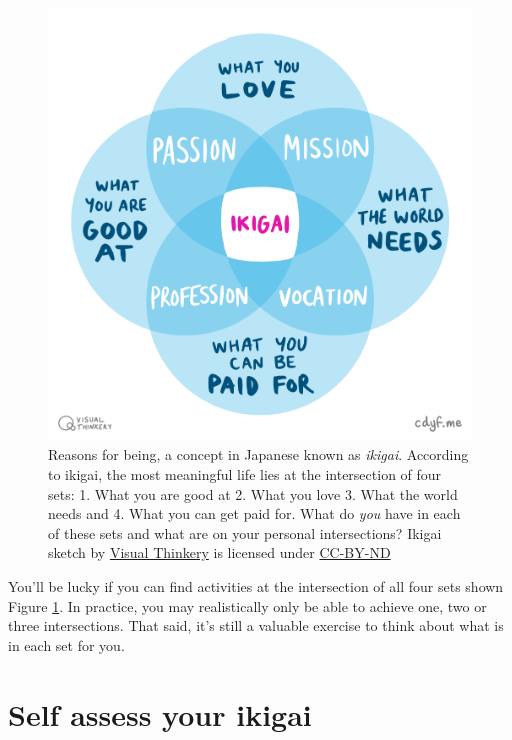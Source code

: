 \documentclass[
]{book}
\begin{document}
\begin{figure}

{\centering \includegraphics[width=1\linewidth]{images/IKIGAI-visual-thinkery} 

}

\caption{Reasons for being, a concept in Japanese known as \emph{ikigai}. According to ikigai, the most meaningful life lies at the intersection of four sets: 1. What you are good at 2. What you love 3. What the world needs and 4. What you can get paid for. What do \emph{you} have in each of these sets and what are on your personal intersections? Ikigai sketch by \href{https://visualthinkery.com}{Visual Thinkery} is licensed under \href{https://creativecommons.org/licenses/by-nd/4.0/}{CC-BY-ND}}\label{fig:iki-fig}
\end{figure}



You'll be lucky if you can find activities at the intersection of all four sets shown Figure \ref{fig:iki-fig}. In practice, you may realistically only be able to achieve one, two or three intersections. That said, it's still a valuable exercise to think about what is in each set for you.

\hypertarget{self-assess-your-ikigai}{%
\section{Self assess your ikigai}\label{self-assess-your-ikigai}}
\end{document}
